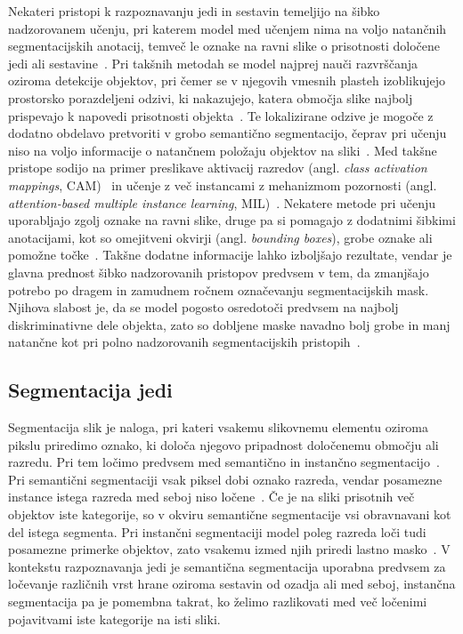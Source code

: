 \documentclass[a4paper,twoside,openright,12pt,slovene]{book}
\begin{document}

            Nekateri pristopi k razpoznavanju jedi in sestavin temeljijo na šibko nadzorovanem učenju, pri katerem model med učenjem nima na voljo natančnih segmentacijskih anotacij, temveč le oznake na ravni slike o prisotnosti določene jedi ali sestavine~\cite{src:zhu2023survey, src:zhu2023new, src:vlachopoulou2023food}.
            Pri takšnih metodah se model najprej nauči razvrščanja oziroma detekcije objektov, pri čemer se v njegovih vmesnih plasteh izoblikujejo prostorsko porazdeljeni odzivi, ki nakazujejo, katera območja slike najbolj prispevajo k napovedi prisotnosti objekta~\cite{src:zhu2023survey}. Te lokalizirane odzive je mogoče z dodatno obdelavo pretvoriti v grobo semantično segmentacijo, čeprav pri učenju niso na voljo informacije o natančnem položaju objektov na sliki~\cite{src:zhu2023survey}. Med takšne pristope sodijo na primer preslikave aktivacij razredov (angl. \emph{class activation mappings}, CAM)~\cite{src:zhu2023survey} in učenje z več instancami z mehanizmom pozornosti (angl. \emph{attention-based multiple instance learning}, MIL)~\cite{src:papadopoulos2021interpretable}.
            Nekatere metode pri učenju uporabljajo zgolj oznake na ravni slike, druge pa si pomagajo z dodatnimi šibkimi anotacijami, kot so omejitveni okvirji (angl. \emph{bounding boxes}), grobe oznake ali pomožne točke~\cite{src:zhu2023survey}. Takšne dodatne informacije lahko izboljšajo rezultate, vendar je glavna prednost šibko nadzorovanih pristopov predvsem v tem, da zmanjšajo potrebo po dragem in zamudnem ročnem označevanju segmentacijskih mask. Njihova slabost je, da se model pogosto osredotoči predvsem na najbolj diskriminativne dele objekta, zato so dobljene maske navadno bolj grobe in manj natančne kot pri polno nadzorovanih segmentacijskih pristopih~\cite{src:zhu2023survey}.

        \subsection{Segmentacija jedi} \label{sct:teorija-segmentacija}

            Segmentacija slik je naloga, pri kateri vsakemu slikovnemu elementu oziroma pikslu priredimo oznako, ki določa njegovo pripadnost določenemu območju ali razredu. Pri tem ločimo predvsem med semantično in instančno segmentacijo~\cite{src:minaee2021image}. Pri semantični segmentaciji vsak piksel dobi oznako razreda, vendar posamezne instance istega razreda med seboj niso ločene~\cite{src:minaee2021image}. Če je na sliki prisotnih več objektov iste kategorije, so v okviru semantične segmentacije vsi obravnavani kot del istega segmenta. Pri instančni segmentaciji model poleg razreda loči tudi posamezne primerke objektov, zato vsakemu izmed njih priredi lastno masko~\cite{src:minaee2021image}. V kontekstu razpoznavanja jedi je semantična segmentacija uporabna predvsem za ločevanje različnih vrst hrane oziroma sestavin od ozadja ali med seboj, instančna segmentacija pa je pomembna takrat, ko želimo razlikovati med več ločenimi pojavitvami iste kategorije na isti sliki.
\end{document}
